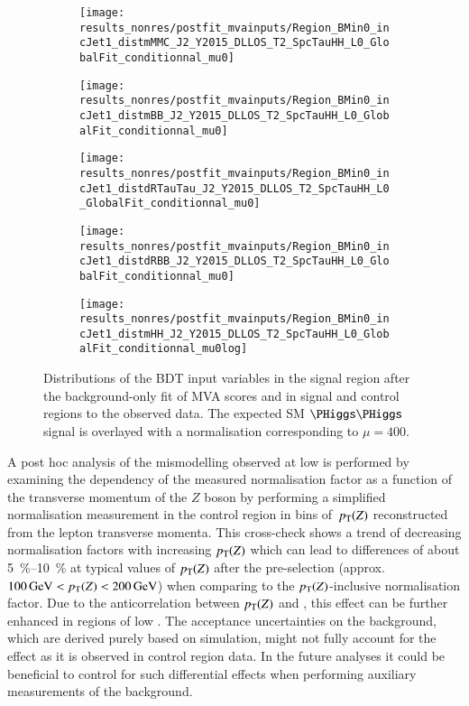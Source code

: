 \begin{figure}[htbp]
  \centering

  \begin{subfigure}{0.46\textwidth}
    \texttt{[image: results\_nonres/postfit\_mvainputs/Region\_BMin0\_incJet1\_distmMMC\_J2\_Y2015\_DLLOS\_T2\_SpcTauHH\_L0\_GlobalFit\_conditionnal\_mu0]}
  \end{subfigure}\hfill%
  \begin{subfigure}{0.46\textwidth}
    \texttt{[image: results\_nonres/postfit\_mvainputs/Region\_BMin0\_incJet1\_distmBB\_J2\_Y2015\_DLLOS\_T2\_SpcTauHH\_L0\_GlobalFit\_conditionnal\_mu0]}
  \end{subfigure}

  \begin{subfigure}{0.46\textwidth}
    \texttt{[image: results\_nonres/postfit\_mvainputs/Region\_BMin0\_incJet1\_distdRTauTau\_J2\_Y2015\_DLLOS\_T2\_SpcTauHH\_L0\_GlobalFit\_conditionnal\_mu0]}
  \end{subfigure}\hfill%
  \begin{subfigure}{0.46\textwidth}
    \texttt{[image: results\_nonres/postfit\_mvainputs/Region\_BMin0\_incJet1\_distdRBB\_J2\_Y2015\_DLLOS\_T2\_SpcTauHH\_L0\_GlobalFit\_conditionnal\_mu0]}
  \end{subfigure}

  \begin{subfigure}{0.46\textwidth}
    \texttt{[image: results\_nonres/postfit\_mvainputs/Region\_BMin0\_incJet1\_distmHH\_J2\_Y2015\_DLLOS\_T2\_SpcTauHH\_L0\_GlobalFit\_conditionnal\_mu0log]}
  \end{subfigure}

  \caption{Distributions of the BDT input variables in the \hadhad
    signal region after the background-only fit of MVA scores and \mll
    in signal and control regions to the observed data. The expected
    SM $\HH$ signal is overlayed with a normalisation corresponding to
    $\mu = 400$.}
  \label{fig:postfit_mva_inputs}
\end{figure}

A post hoc analysis of the mismodelling observed at low \dRtautau is
performed by examining the dependency of the measured \ZHF
normalisation factor as a function of the transverse momentum of the
$Z$ boson by performing a simplified normalisation measurement in the
control region in bins of~$p_{\text{T}}(Z)$ reconstructed from the lepton
transverse momenta. This cross-check shows a trend of decreasing \ZHF
normalisation factors with increasing $p_{\text{T}}(Z)$ which can lead to
differences of about \SIrange{5}{10}{\percent} at typical values of
$p_{\text{T}}(Z)$ after the \hadhad pre-selection (approx.\
$\SI{100}{\GeV} < \pT(Z) < \SI{200}{\GeV}$) when comparing to the
$p_{\text{T}}(Z)$-inclusive normalisation factor. Due to the anticorrelation
between $p_{\text{T}}(Z)$ and \dRtautau, this effect can be further enhanced in
regions of low \dRtautau. The acceptance uncertainties on the \ZHF
background, which are derived purely based on simulation, might not
fully account for the effect as it is observed in control region
data. In the future analyses it could be beneficial to control for
such differential effects when performing auxiliary measurements of
the \ZHF background.\todo{Put a plot in appendix?}

